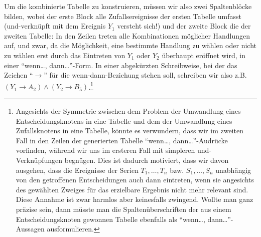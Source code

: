 Um die kombinierte Tabelle zu konstruieren, müssen wir also zwei Spaltenblöcke
bilden, wobei der erste Block alle Zufallsereignisse der ersten Tabelle umfasst
(und-verknüpft mit dem Ereignis $Y_1$ versteht sich!) und der zweite Block die
der zweiten Tabelle: In den Zeilen treten alle Kombinationen möglicher
Handlungen auf, und zwar, da die Möglichkeit, eine bestimmte Handlung zu
wählen oder nicht zu wählen erst durch das Eintreten von $Y_1$ oder $Y_2$
überhaupt eröffnet wird, in einer "`wenn\ldots, dann\ldots"'-Form. In einer 
abgekürzten Schreibweise, bei der das Zeichen "`$\rightarrow$"' für die 
wenn-dann-Beziehung stehen soll, schreiben wir also z.B.
$(Y_1 \rightarrow A_2) \wedge (Y_2 \rightarrow B_5)$.\footnote{Angesichts der 
Symmetrie zwischen dem Problem der Umwandlung eines Entscheidungsknotens 
in eine Tabelle und dem der Umwandlung eines
Zufallsknotens in eine Tabelle, könnte es verwundern, dass wir im zweiten Fall
in den Zeilen der generierten Tabelle "`wenn\ldots, dann\ldots"'-Audrücke
vorfinden, während wir uns im ersteren Fall mit simpleren und-Verknüpfungen
begnügen. Dies ist dadurch motiviert, dass wir davon ausgehen, dass die
Ereignisse der Serien $T_1, \ldots, T_n$ bzw. $S_1, \ldots, S_n$ unabhängig von
den getroffenen Entscheidungen auch dann eintreten, wenn sie angesichts des gewählten Zweiges
für das erzielbare Ergebnis nicht mehr relevant sind. Diese Annahme ist
zwar harmlos aber keinesfalls zwingend. Wollte man ganz präzise sein, dann
müsste man die Spaltenüberschriften der aus einem Entscheidungsknoten gewonnen Tabelle
ebenfalls als "`wenn\ldots, dann\ldots"'-Aussagen ausformulieren.}

